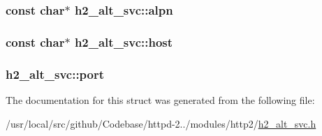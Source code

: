 \subsubsection[{\texorpdfstring{alpn}{alpn}}]{\setlength{\rightskip}{0pt plus 5cm}const char$\ast$ h2\+\_\+alt\+\_\+svc\+::alpn}\hypertarget{structh2__alt__svc_a4251ac7b55f03e778ea7be11e3d006bc}{}\label{structh2__alt__svc_a4251ac7b55f03e778ea7be11e3d006bc}
\subsubsection[{\texorpdfstring{host}{host}}]{\setlength{\rightskip}{0pt plus 5cm}const char$\ast$ h2\+\_\+alt\+\_\+svc\+::host}\hypertarget{structh2__alt__svc_a3c9356bc046c3f6d41f4b7f9f6331e89}{}\label{structh2__alt__svc_a3c9356bc046c3f6d41f4b7f9f6331e89}
\subsubsection[{\texorpdfstring{port}{port}}]{ h2\+\_\+alt\+\_\+svc\+::port}\hypertarget{structh2__alt__svc_ad66fa5cd21dc292cf99ff80f1f7249a9}{}\label{structh2__alt__svc_ad66fa5cd21dc292cf99ff80f1f7249a9}


The documentation for this struct was generated from the following file\+:\begin{DoxyCompactItemize}
\item 
/usr/local/src/github/\+Codebase/httpd-\/2../modules/http2/\hyperlink{h2__alt__svc_8h}{h2\+\_\+alt\+\_\+svc.\+h}\end{DoxyCompactItemize}
